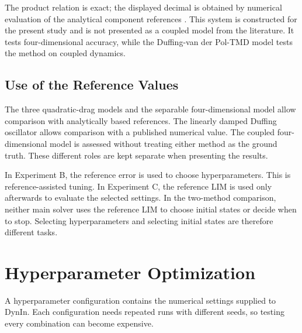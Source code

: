 The product relation is exact; the displayed decimal is obtained by numerical evaluation of the analytical component references \cite{ref13}. This system is constructed for the present study and is not presented as a coupled model from the literature. It tests four-dimensional accuracy, while the Duffing-van der Pol-TMD model tests the method on coupled dynamics.

\subsection{Use of the Reference Values}

The three quadratic-drag models and the separable four-dimensional model allow comparison with analytically based references. The linearly damped Duffing oscillator allows comparison with a published numerical value. The coupled four-dimensional model is assessed without treating either method as the ground truth. These different roles are kept separate when presenting the results.

In Experiment B, the reference error is used to choose hyperparameters. This is reference-assisted tuning. In Experiment C, the reference LIM is used only afterwards to evaluate the selected settings. In the two-method comparison, neither main solver uses the reference LIM to choose initial states or decide when to stop. Selecting hyperparameters and selecting initial states are therefore different tasks.

\section{Hyperparameter Optimization}
\label{sec:optimization-background}

A hyperparameter configuration contains the numerical settings supplied to DynIn. Each configuration needs repeated runs with different seeds, so testing every combination can become expensive.

